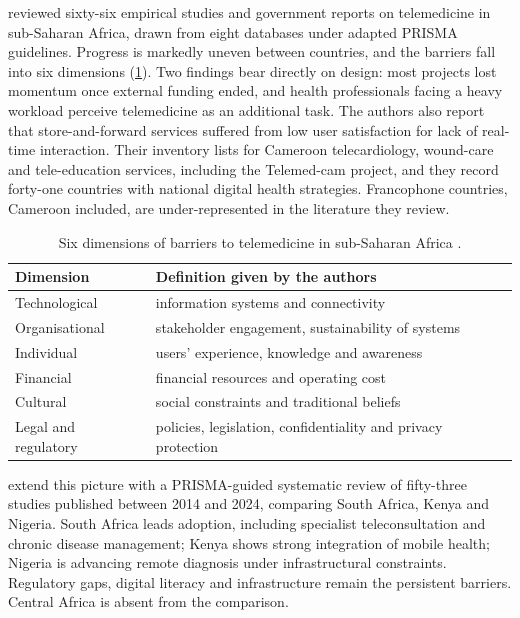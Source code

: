 \Textcite{dodoo2022} reviewed sixty-six empirical studies and government reports on telemedicine in sub-Saharan Africa, drawn from eight databases under adapted PRISMA guidelines. Progress is markedly uneven between countries, and the barriers fall into six dimensions (\cref{tab:barriers}). Two findings bear directly on design: most projects lost momentum once external funding ended, and health professionals facing a heavy workload perceive telemedicine as an additional task. The authors also report that store-and-forward services suffered from low user satisfaction for lack of real-time interaction. Their inventory lists for Cameroon telecardiology, wound-care and tele-education services, including the Telemed-cam project, and they record forty-one countries with national digital health strategies. Francophone countries, Cameroon included, are under-represented in the literature they review.

\begin{table}[htbp]
\centering\small
\caption{Six dimensions of barriers to telemedicine in sub-Saharan Africa \parencite{dodoo2022}.}\label{tab:barriers}
\begin{tabularx}{\textwidth}{@{}>{\raggedright\arraybackslash}p{3.4cm} X@{}}
\toprule
\textbf{Dimension} & \textbf{Definition given by the authors} \\
\midrule
Technological & information systems and connectivity \\
Organisational & stakeholder engagement, sustainability of systems \\
Individual & users' experience, knowledge and awareness \\
Financial & financial resources and operating cost \\
Cultural & social constraints and traditional beliefs \\
Legal and regulatory & policies, legislation, confidentiality and privacy protection \\
\bottomrule
\end{tabularx}
\end{table}

\Textcite{agbeyangi2025} extend this picture with a PRISMA-guided systematic review of fifty-three studies published between 2014 and 2024, comparing South Africa, Kenya and Nigeria. South Africa leads adoption, including specialist teleconsultation and chronic disease management; Kenya shows strong integration of mobile health; Nigeria is advancing remote diagnosis under infrastructural constraints. Regulatory gaps, digital literacy and infrastructure remain the persistent barriers. Central Africa is absent from the comparison.

